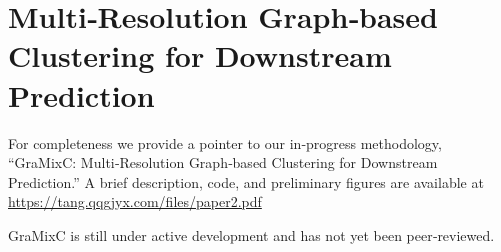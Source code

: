 \documentclass{article}
\begin{document}
\printbibliography


\appendix

\section{Multi‑Resolution Graph‑based Clustering for Downstream Prediction}
\label{sec:gmc}

For completeness we provide a pointer to our in‑progress methodology, ``GraMixC: Multi‑Resolution Graph‑based Clustering for Downstream Prediction.''
A brief description, code, and preliminary figures are available at         \url{https://tang.qqgjyx.com/files/paper2.pdf}

GraMixC is still under active development and has not yet been peer‑reviewed.
\end{document}
